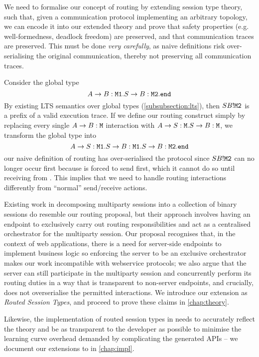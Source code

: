 We need to formalise our concept of routing by extending session
type theory, such that, given a communication protocol implementing 
an arbitrary topology, we can encode it into our extended theory and
prove that safety properties (e.g. well-formedness, deadlock freedom)
are preserved, and that communication traces are preserved.
This must be done \textit{very carefully}, as
naive definitions risk over-serialising the original communication,
thereby not preserving all communication traces.

\begin{example}
Consider the global type
\[
A \to B: \texttt{M1}. S \to B: \texttt{M2}. \texttt{end}
\]
By existing LTS semantics over
global types (\cref{subsubsection:lts}), then $SB!\texttt{M2}$
is a prefix of a valid execution trace.
If we define our routing construct simply by replacing every single
$A \to B: \texttt{M}$ interaction with $A \to S: \texttt{M}.
S \to B: \texttt{M}$, we transform the global type into
\[
A \to S: \texttt{M1}. S \to B: \texttt{M1}. S \to B: \texttt{M2}. \texttt{end}
\]
our naive definition of routing has over-serialised the protocol
since $SB!\texttt{M2}$ can no longer occur first because 
is forced to send  first, which it cannot do so until receiving
from .
This implies that we need to handle routing interactions differently
from ``normal'' send/receive actions.
\end{example}

Existing work in decomposing multiparty sessions into a collection
of binary sessions do resemble our routing proposal, but their approach
involves having an endpoint to exclusively carry out
routing responsibilities and act as a centralised orchestrator 
for the multiparty session.
Our proposal recognises that, in the context of web applications,
there is a need for server-side endpoints to implement business logic
so enforcing the server to be an exclusive orchestrator makes our work
incompatible with webservice protocols; 
we also argue that the server can still participate in the 
multiparty session and concurrently perform its routing duties
in a way that is transparent to non-server endpoints, and crucially,
does not overserialise the permitted interactions. 
We introduce our extension as \textit{Routed Session Types},
and proceed to prove these claims in \cref{chap:theory}.

Likewise, the implementation of routed session types 
in  needs to accurately reflect the theory
and be as transparent to the developer as possible to minimise
the learning curve overhead demanded 
by complicating the generated APIs -- we document our extensions
to  in \cref{chap:impl}.